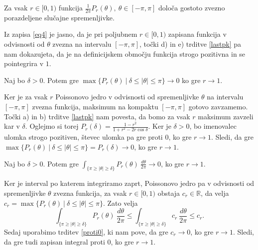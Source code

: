 \documentclass[mat1, tisk]{fmfdelo}
\begin{document}
    \begin{posledica}
        Za vsak $r \in [0, 1)$ funkcija $\frac{1}{2 \pi} P_r(\theta),~ \theta \in [-\pi, \pi]$ določa gostoto zvezno porazdeljene slučajne spremenljivke.
    \end{posledica}
    \begin{dokaz}
        Iz zapisa \eqref{eq4} je jasno, da je pri poljubnem $r \in [0,1)$ zapisana funkcija v odvisnosti od $\theta$ zvezna na intervalu $[-\pi, \pi]$, točki d) in e) trditve \ref{lastpk} pa nam dokazujeta, da je na definicijskem območju funkcija strogo pozitivna in se pointegrira v $1$.
    \end{dokaz}

    \begin{trditev}
        \label{proti0}
        Naj bo $\delta > 0$. Potem gre $\max\{P_r(\theta)~|~ \delta \leq |\theta| \leq \pi\} \to 0$ ko gre $r \to 1$.
    \end{trditev}
    \begin{dokaz}
        Ker je za vsak $r$ Poissonovo jedro v odvisnosti od spremenljivke $\theta$ na intervalu $[-\pi, \pi]$ zvezna funkcija, maksimum na kompaktu $[-\pi, \pi]$ gotovo zavzamemo. Točki a) in b) trditve \ref{lastpk} nam povesta, da bomo za vsak $r$ maksimum zavzeli kar v $\delta$. 
        Oglejmo si torej $P_r(\delta) = \frac{1 -r^2}{1 + r^2 - 2r \cos\delta}$. Ker je $\delta >0 $, bo imenovalec ulomka strogo pozitiven, števec ulomka pa gre proti $0$, ko gre $r \to 1$. 
        Sledi, da gre \mbox{$\max\{P_r(\theta)~|~ \delta \leq |\theta| \leq \pi\} = P_r(\delta) \to 0$}, ko gre $r \to 1$.
    \end{dokaz}
    \begin{posledica}
        \label{int_proti0}
        Naj bo $\delta > 0$. Potem gre ${\int_{\{\pi \geq |\theta| \geq \delta\}}{P_{r}(\theta)~\frac{d\theta}{2 \pi}}} \to 0$, ko gre $r \to 1$.
    \end{posledica}
    \begin{dokaz}
        Ker je interval po katerem integriramo zaprt, Poissonovo jedro pa v odvisnosti od spremenljivke $\theta$ zvezna funkcija, za vsak $r \in [0,1)$ obstaja $c_r \in \mathbb{R}$, da velja $c_r = \max\{P_r(\theta)~|~ \delta \leq |\theta| \leq \pi\}$. Zato velja
        $$
        {\int_{\{\pi \geq |\theta| \geq \delta\}}{P_{r}(\theta)~\frac{d\theta}{2 \pi}}} \leq {\int_{\{\pi \geq |\theta| \geq \delta\}}{c_r~\frac{d\theta}{2 \pi}}} \leq c_r.
        $$
        Sedaj uporabimo trditev \ref{proti0}, ki nam pove, da gre $c_r \to 0$, ko gre $r \to 1$. Sledi, da gre tudi zapisan integral proti $0$, ko gre $r \to 1$.
    \end{dokaz}
\end{document}
